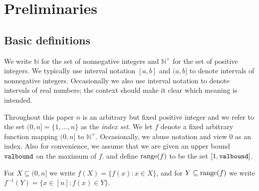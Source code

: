 \documentclass{acmsmall}
\newcommand{\maxval}{{\tt valbound}}
\begin{document}
\section{Preliminaries}
\label{sec:prelim}
\subsection{Basic definitions}
\label{subsec:basic defs}

We write $\mathbb{N}$ for the set of nonnegative integers and $\mathbb{N}^+$
for the set of positive integers.   We typically use interval notation $[a,b]$ and $(a,b]$
to denote intervals of nonnegative integers.  Occasionally we also use interval notation
to denote intervals of real numbers; the context should make it clear which meaning is intended.

Throughout this paper $n$ is an arbitrary but fixed positive integer and we refer to the
set $(0,n]=\{1,\ldots,n\}$ as the {\em index set}.  We let $f$ denote a fixed arbitrary
function mapping $(0,n]$ to $\mathbb{N}^+$.  
Occasionally,  we abuse notation and 
view 0 as an index. 
Also for convenience,
we assume that we are given an upper bound $\maxval$ on the maximum of $f$.    
and define ${\rm range}(f)$ to be the set $[1,\maxval]$.  

For $X \subseteq (0,n]$ we write $f(X)=\{f(x):x \in X\}$, and  
for $Y \subseteq {\rm range}(f)$ we
write $f^{-1}(Y)=\{x \in [n]:f(x) \in Y\}$.
\end{document}
